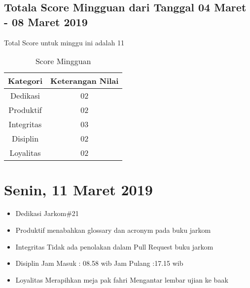 \subsection{Totala Score Mingguan dari Tanggal 04 Maret - 08 Maret 2019}
Total Score untuk minggu ini adalah 11

\begin{table}[h]
\caption{Score Mingguan}
\centering
\begin{tabular}{|c|c|}
\hline
\textbf{Kategori}&\textbf{Keterangan Nilai}\\
\hline
Dedikasi&02\\
\hline
Produktif&02\\
\hline
Integritas&03\\
\hline
Disiplin&02\\
\hline
Loyalitas&02\\
\hline
\end{tabular}
\label{table:score mingguan}
\end{table}


\section{Senin, 11 Maret 2019}
\begin{itemize}
\item Dedikasi
\subitem Jarkom\#21
\item Produktif
  \subitem menabahkan glossary dan acronym pada buku jarkom
\item Integritas
  \subitem Tidak ada penolakan dalam Pull Request buku jarkom
\item Disiplin
  \subitem Jam Masuk : 08.58 wib
  \subitem Jam Pulang :17.15 wib
\item Loyalitas
  \subitem Merapihkan meja pak fahri
  \subitem Mengantar lembar ujian ke baak
\end{itemize}
